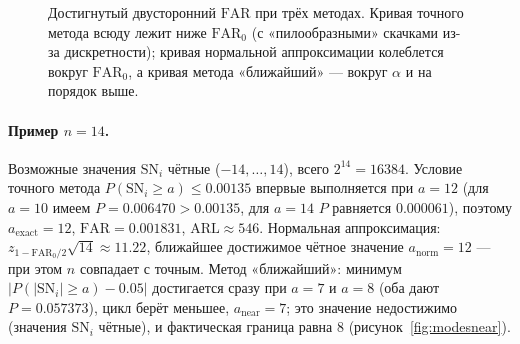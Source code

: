 \documentclass[11pt,a4paper]{article}
\newcommand{\SN}{\mathrm{SN}}
\def\verFARCons{(1,1.000000) (2,0.500000) (3,0.250000) (4,0.125000) (5,0.062500) (6,0.031250) (7,0.015625) (8,0.007812) (9,0.003906) (10,0.001953) (11,0.000977) (12,0.000488) (13,0.000244) (14,0.001831) (15,0.000977) (16,0.000519) (17,0.002350) (18,0.001312) (19,0.000729) (20,0.002577) (21,0.001490) (22,0.000855) (23,0.002599) (24,0.001544) (25,0.000911) (26,0.002494) (27,0.001514) (28,0.000912) (29,0.002316) (30,0.001431)}
\def\verFARSym{(1,1.000000) (2,0.500000) (3,0.250000) (4,0.125000) (5,0.062500) (6,0.031250) (7,0.015625) (8,0.007812) (9,0.003906) (10,0.001953) (11,0.000977) (12,0.000488) (13,0.003418) (14,0.001831) (15,0.000977) (16,0.004181) (17,0.002350) (18,0.001312) (19,0.000729) (20,0.002577) (21,0.001490) (22,0.000855) (23,0.002599) (24,0.001544) (25,0.004077) (26,0.002494) (27,0.001514) (28,0.003719) (29,0.002316) (30,0.001431)}
\def\verFARNear{(1,1.000000) (2,0.500000) (3,0.250000) (4,0.125000) (5,0.062500) (6,0.031250) (7,0.015625) (8,0.070312) (9,0.039062) (10,0.021484) (11,0.065430) (12,0.038574) (13,0.022461) (14,0.057373) (15,0.035156) (16,0.076813) (17,0.049042) (18,0.030884) (19,0.063568) (20,0.041389) (21,0.026604) (22,0.052479) (23,0.034690) (24,0.063915) (25,0.043285) (26,0.028959) (27,0.052239) (28,0.035698) (29,0.061428) (30,0.042774)}
\begin{document}
\begin{figure}[htbp]\centering
{}
\caption{Достигнутый двусторонний $\mathrm{FAR}$ при трёх методах. Кривая
точного метода всюду лежит ниже $\mathrm{FAR}_0$ (с «пилообразными»
скачками из-за дискретности); кривая нормальной аппроксимации колеблется
вокруг $\mathrm{FAR}_0$, а кривая метода «ближайший» --- вокруг $\alpha$ и на
порядок выше.}
\label{fig:modesfar}
\end{figure}

\paragraph{Пример $n=14$.}
Возможные значения $\SN_i$ чётные ($-14,\dots,14$), всего $2^{14}=16384$.
Условие точного метода $P(\SN_i\ge a)\le0.00135$ впервые выполняется
при $a=12$ (для $a=10$ имеем $P=0.006470>0.00135$, для $a=14$ $P$ равняется
$0.000061$), поэтому $a_{\mathrm{exact}}=12$,
$\mathrm{FAR}=0.001831$, $\mathrm{ARL}\approx546$. Нормальная аппроксимация:
$z_{1-\mathrm{FAR}_0/2}\sqrt{14}\approx11.22$, ближайшее достижимое чётное
значение $a_{\mathrm{norm}}=12$ --- при этом $n$ совпадает с точным.
Метод «ближайший»:
минимум $|P(|\SN_i|\ge a)-0.05|$ достигается сразу при $a=7$ и $a=8$ (оба
дают $P=0.057373$), цикл берёт меньшее, $a_{\mathrm{near}}=7$; это значение
недостижимо (значения $\SN_i$ чётные), и фактическая граница равна $8$
(рисунок~\ref{fig:modesnear}).
\end{document}
